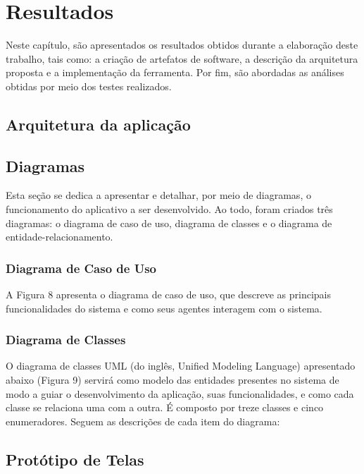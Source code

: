 \chapter{Resultados}\label{ch:resultados}
Neste capítulo, são apresentados os resultados obtidos durante a elaboração deste trabalho, tais como: a criação de artefatos de software, a descrição da arquitetura proposta e a implementação da ferramenta.
Por fim, são abordadas as análises obtidas por meio dos testes realizados.


\section{Arquitetura da aplicação}\label{sec:arquitetura-aplicacao}


\section{Diagramas}\label{sec:diagramas}
Esta seção se dedica a apresentar e detalhar, por meio de diagramas, o funcionamento do aplicativo a ser desenvolvido.
Ao todo, foram criados três diagramas: o diagrama de caso de uso, diagrama de classes e o diagrama de entidade-relacionamento.

\subsection{Diagrama de Caso de Uso}\label{subsec: diagrama-caso-uso}
A Figura 8 apresenta o diagrama de caso de uso, que descreve as principais
funcionalidades do sistema e como seus agentes interagem com o sistema.


\subsection{Diagrama de Classes}\label{subsec: diagrama-classes}
O diagrama de classes UML (do inglês, Unified Modeling Language) apresentado
abaixo (Figura 9) servirá como modelo das entidades presentes no sistema de modo a guiar
o desenvolvimento da aplicação, suas funcionalidades, e como cada classe se relaciona uma
com a outra.
É composto por treze classes e cinco enumeradores. Seguem as descrições de cada item do diagrama:

\section{Protótipo de Telas}\label{sec:prototipo}



